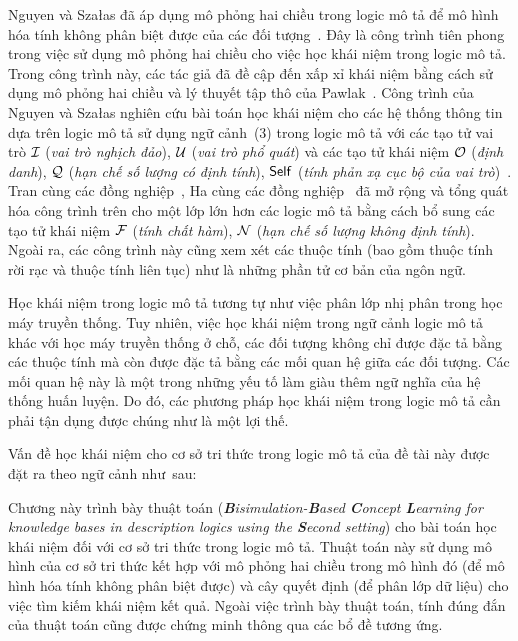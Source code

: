 Nguyen và Sza{\l}as đã áp dụng mô phỏng hai chiều trong logic mô tả để mô hình hóa tính không phân biệt được của các đối tượng~\cite{Nguyen2013}. Đây là công trình tiên phong trong việc sử dụng mô phỏng hai chiều cho việc học khái niệm trong logic mô tả. Trong công trình này, các tác giả đã đề cập đến xấp xỉ khái niệm bằng cách sử dụng mô phỏng hai chiều và lý thuyết tập thô của Pawlak~\cite{Pawlak1992,Pawlak2007}. 
Công trình của Nguyen và Sza{\l}as nghiên cứu bài toán học khái niệm cho các hệ thống thông tin dựa trên logic mô tả sử dụng ngữ cảnh~(3) trong logic mô tả \ALC với các tạo tử vai trò $\mathcal{I}$ ({\em vai trò nghịch đảo}), $\mathcal{U}$ ({\em vai trò phổ quát}) và các tạo tử khái niệm $\mathcal{O}$ ({\em định danh}), $\mathcal{Q}$ ({\em hạn chế số lượng có định tính}), $\mathsf{Self}$ ({\em tính phản xạ cục bộ của vai trò})~\cite{Nguyen2013}.
Tran cùng các đồng nghiệp~\cite{Tran2012}, Ha cùng các đồng nghiệp~\cite{Ha2012} đã mở rộng và tổng quát hóa công trình trên cho một lớp lớn hơn các logic mô tả bằng cách bổ sung các tạo tử khái niệm $\mathcal{F}$ ({\em tính chất hàm}), $\mathcal{N}$ ({\em hạn chế số lượng không định tính}). Ngoài ra, các công trình này cũng xem xét các thuộc tính (bao gồm thuộc tính rời rạc và thuộc tính liên tục) như là những phần tử cơ bản của ngôn ngữ.

Học khái niệm trong logic mô tả tương tự như việc phân lớp nhị phân trong học máy truyền thống. Tuy nhiên, việc học khái niệm trong ngữ cảnh logic mô tả khác với học máy truyền thống ở chỗ, các đối tượng không chỉ được đặc tả bằng các thuộc tính mà còn được đặc tả bằng các mối quan hệ giữa các đối tượng. Các mối quan hệ này là một trong những yếu tố làm giàu thêm ngữ nghĩa của hệ thống huấn luyện. Do đó, các phương pháp học khái niệm trong logic mô tả cần phải tận dụng được chúng như là một lợi thế.

Vấn đề học khái niệm cho cơ sở tri thức trong logic mô tả của đề tài này được đặt ra theo ngữ cảnh như~sau:

\noindent
{}

Chương này trình bày thuật toán {\em \BBCLearnS} ({\em \textbf{B}isimulation-\textbf{B}ased \textbf{C}oncept \textbf{L}earning for knowledge bases in description logics using the \textbf{S}econd setting}) cho bài toán học khái niệm đối với cơ sở tri thức trong logic mô tả. Thuật toán này sử dụng mô hình của cơ sở tri thức kết hợp với mô phỏng hai chiều trong mô hình đó (để mô hình hóa tính không phân biệt được) và cây quyết định (để phân lớp dữ liệu) cho việc tìm kiếm khái niệm kết quả. Ngoài việc trình bày thuật toán, tính đúng đắn của thuật toán cũng được chứng minh thông qua các bổ đề tương ứng.

